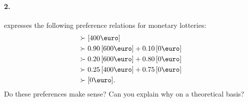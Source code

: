 \documentclass[a4paper,notitlepage,12pt]{article}
\begin{document}
\paragraph{2. } \TAtwo{} expresses the following preference relations for monetary lotteries:
\begin{align*}
	[600\text{\euro}] & \succ [400\text{\euro}] \\
							 			& \succ 0.90 \, [600\text{\euro}] + 0.10 \, [0\text{\euro}] \\
							 			& \succ 0.20 \, [600\text{\euro}] + 0.80 \, [0\text{\euro}] \\
							 			& \succ 0.25 \, [400\text{\euro}] + 0.75 \, [0\text{\euro}] \\
							 			& \succ [0\text{\euro}].
\end{align*}
Do these preferences make sense? Can you explain why on a theoretical basis?
\end{document}
